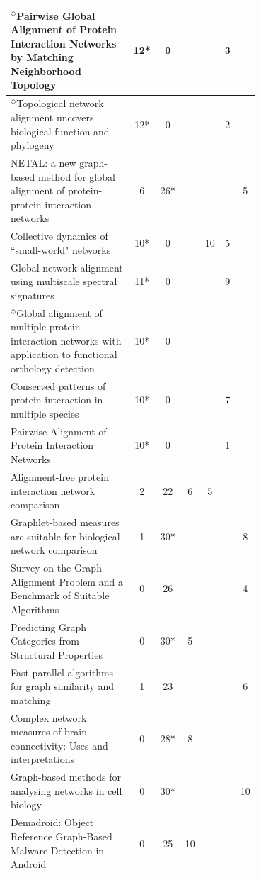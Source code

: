 \documentclass[12pt]{thesis}
\theoremstyle{plain}
\theoremstyle{definition}
\theoremstyle{remark}
\begin{document}
\begin{table}[H]
{\begin{tabular}{|L{0.7\linewidth}|c|c|c|c|c|c|}
$^\Diamond$Pairwise Global Alignment of Protein Interaction Networks by Matching Neighborhood Topology  \cite{Singh_2007} & 12* & 0 &  &  & 3 &  \\ \hline
$^\Diamond$Topological network alignment uncovers biological function and phylogeny  \cite{Kuchaiev_2010} & 12* & 0 &  &  & 2 &  \\ \hline
NETAL: a new graph-based method for global alignment of protein-protein interaction networks  \cite{Neyshabur_2013} & 6 & 26* &  &  &  & 5 \\ \hline
Collective dynamics of ``small-world" networks  \cite{Watts_1998} & 10* & 0 &  & 10 & 5 &  \\ \hline
Global network alignment using multiscale spectral signatures  \cite{Patro_2012} & 11* & 0 &  &  & 9 &  \\ \hline
$^\Diamond$Global alignment of multiple protein interaction networks with application to functional orthology detection  \cite{Singh_2008} & 10* & 0 &  &  &  &  \\ \hline
Conserved patterns of protein interaction in multiple species  \cite{Sharan_2005} & 10* & 0 &  &  & 7 &  \\ \hline
Pairwise Alignment of Protein Interaction Networks  \cite{Koyoturk_2006} & 10* & 0 &  &  & 1 &  \\ \hline
Alignment-free protein interaction network comparison  \cite{Ali_2014} & 2 & 22 & 6 & 5 &  &  \\ \hline
Graphlet-based measures are suitable for biological network comparison  \cite{Hayes_2013} & 1 & 30* &  &  &  & 8 \\ \hline
Survey on the Graph Alignment Problem and a Benchmark of Suitable Algorithms  \cite{Dopmann_2013} & 0 & 26 &  &  &  & 4 \\ \hline
Predicting Graph Categories from Structural Properties  \cite{Canning_2018} & 0 & 30* & 5 &  &  &  \\ \hline
Fast parallel algorithms for graph similarity and matching  \cite{Kollias_2014} & 1 & 23 &  &  &  & 6 \\ \hline
Complex network measures of brain connectivity: Uses and interpretations  \cite{Rubinov_2010} & 0 & 28* & 8 &  &  &  \\ \hline
Graph-based methods for analysing networks in cell biology  \cite{Aittokallio_2006} & 0 & 30* &  &  &  & 10 \\ \hline
Demadroid: Object Reference Graph-Based Malware Detection in Android  \cite{Wang_2018} & 0 & 25 & 10 &  &  &  \\ \hline

\end{tabular}}
\end{table}
\end{document}
